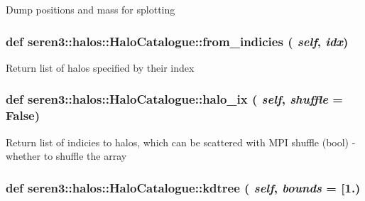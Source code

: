 \label{classseren3_1_1halos_1_1HaloCatalogue_a29ba93e6d4e6d58c9f41e188859afed0}
\begin{DoxyVerb}
Dump positions and mass for splotting
\end{DoxyVerb}
 \hypertarget{classseren3_1_1halos_1_1HaloCatalogue_ac60c033912b79c5c99467b1e9bef6bd1}{
\subsubsection[{from\_\-indicies}]{\setlength{\rightskip}{0pt plus 5cm}def seren3::halos::HaloCatalogue::from\_\-indicies ( {\em self}, \/   {\em idx})}}
\label{classseren3_1_1halos_1_1HaloCatalogue_ac60c033912b79c5c99467b1e9bef6bd1}
\begin{DoxyVerb}
Return list of halos specified by their index
\end{DoxyVerb}
 \hypertarget{classseren3_1_1halos_1_1HaloCatalogue_a2a321b00de6d83e12798257a39a941dd}{
\subsubsection[{halo\_\-ix}]{\setlength{\rightskip}{0pt plus 5cm}def seren3::halos::HaloCatalogue::halo\_\-ix ( {\em self}, \/   {\em shuffle} = {\ttfamily False})}}
\label{classseren3_1_1halos_1_1HaloCatalogue_a2a321b00de6d83e12798257a39a941dd}
\begin{DoxyVerb}
Return list of indicies to halos, which can be scattered with MPI
shuffle (bool) - whether to shuffle the array
\end{DoxyVerb}
 \hypertarget{classseren3_1_1halos_1_1HaloCatalogue_a098e225cff11926a6d9d76b137933f33}{
\subsubsection[{kdtree}]{\setlength{\rightskip}{0pt plus 5cm}def seren3::halos::HaloCatalogue::kdtree ( {\em self}, \/   {\em bounds} = {\ttfamily \mbox{[}1.})}}
\label{classseren3_1_1halos_1_1HaloCatalogue_a098e225cff11926a6d9d76b137933f33}
